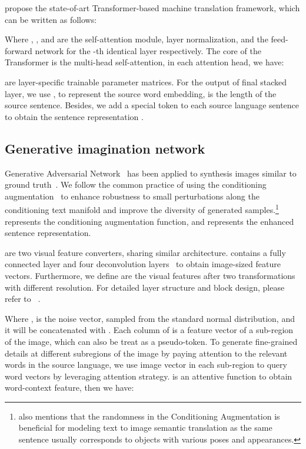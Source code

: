 \documentclass[11pt]{article}
\begin{document}
\citet{vaswani2017attention} propose the state-of-art Transformer-based machine translation framework, which can be written as follows:





Where , , and  are the self-attention module, layer normalization, and the feed-forward network for the -th identical layer respectively. The core of the Transformer is the multi-head self-attention, in each attention head, we have:





 are layer-specific trainable parameter matrices. For the output of final stacked layer, we use ,  to represent the source word embedding,  is the length of the source sentence. Besides, we add a special token to each source language sentence to obtain the sentence representation .

\subsection{Generative imagination network}

Generative Adversarial Network~\cite{goodfellow2014generative} has been applied to synthesis images similar to ground truth~\cite{zhang2017stackgan,xu2018attngan,qiao2019mirrorgan}. We follow the common practice of using the conditioning augmentation~\cite{zhang2017stackgan} to enhance robustness to small perturbations along the conditioning text manifold and improve the diversity of generated samples.\footnote{\citet{zhang2017stackgan} also mentions that the randomness in the Conditioning Augmentation is beneficial for modeling text to image semantic translation as the same sentence usually corresponds to objects with various poses and appearances.}  represents the conditioning augmentation function, and  represents the enhanced sentence representation.



 are two visual feature converters, sharing similar architecture.  contains a fully connected layer and four deconvolution layers~\cite{Noh2015LearningDN} to obtain image-sized feature vectors. Furthermore, we define  are the visual features after two transformations with different resolution. For detailed layer structure and block design, please refer to ~\cite{xu2018attngan}.





Where ,  is the noise vector, sampled from the standard normal distribution, and it will be concatenated with . Each column of  is a feature vector of a sub-region of the image, which can also be treat as a pseudo-token. To generate fine-grained details at different subregions of the image by paying attention to the relevant words in the source language, we use image vector in each sub-region to query word vectors by leveraging attention strategy.  is an attentive function to obtain word-context feature, then we have:
\end{document}
